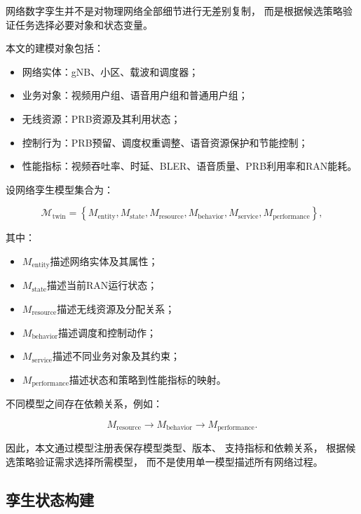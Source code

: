 \documentclass[lang=cn,12pt]{elegantbook}
\begin{document}
网络数字孪生并不是对物理网络全部细节进行无差别复制，
而是根据候选策略验证任务选择必要对象和状态变量。

本文的建模对象包括：

\begin{itemize}
    \item 网络实体：gNB、小区、载波和调度器；
    \item 业务对象：视频用户组、语音用户组和普通用户组；
    \item 无线资源：PRB资源及其利用状态；
    \item 控制行为：PRB预留、调度权重调整、语音资源保护和节能控制；
    \item 性能指标：视频吞吐率、时延、BLER、语音质量、PRB利用率和RAN能耗。
\end{itemize}

设网络孪生模型集合为：

\begin{equation}
\mathcal{M}_{\mathrm{twin}}
=
\left\{
M_{\mathrm{entity}},
M_{\mathrm{state}},
M_{\mathrm{resource}},
M_{\mathrm{behavior}},
M_{\mathrm{service}},
M_{\mathrm{performance}}
\right\},
\label{eq:twin_model_system}
\end{equation}

其中：

\begin{itemize}
    \item $M_{\mathrm{entity}}$描述网络实体及其属性；
    \item $M_{\mathrm{state}}$描述当前RAN运行状态；
    \item $M_{\mathrm{resource}}$描述无线资源及分配关系；
    \item $M_{\mathrm{behavior}}$描述调度和控制动作；
    \item $M_{\mathrm{service}}$描述不同业务对象及其约束；
    \item $M_{\mathrm{performance}}$描述状态和策略到性能指标的映射。
\end{itemize}

不同模型之间存在依赖关系，例如：

\begin{equation}
M_{\mathrm{resource}}
\rightarrow
M_{\mathrm{behavior}}
\rightarrow
M_{\mathrm{performance}}.
\label{eq:model_dependency_chain}
\end{equation}

因此，本文通过模型注册表保存模型类型、版本、
支持指标和依赖关系，
根据候选策略验证需求选择所需模型，
而不是使用单一模型描述所有网络过程。


\subsection*{孪生状态构建}
\end{document}
